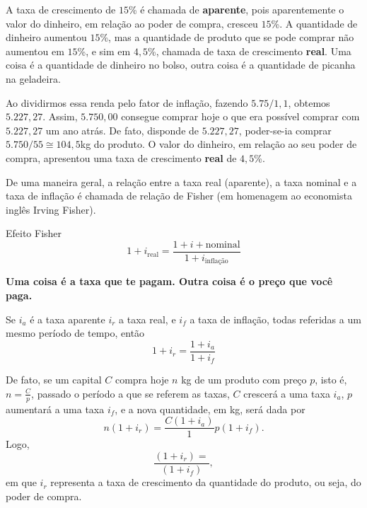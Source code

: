 A taxa de crescimento de $15$\% é chamada de \textbf{aparente}, pois aparentemente o valor do dinheiro, em relação ao poder de compra, cresceu $15$\%. A quantidade de dinheiro aumentou $15$\%, mas a quantidade de produto que se pode comprar não aumentou em $15$\%, e sim em $4{,}5$\%, chamada de taxa de crescimento \textbf{real}. Uma coisa é a quantidade de dinheiro no bolso, outra coisa é a quantidade de picanha na geladeira.

Ao dividirmos essa renda pelo fator de inflação, fazendo $5.75/1{,}1$, obtemos $5.227{,}27$. Assim, $5.750{,}00$ consegue comprar hoje o que era possível comprar com $5.227{,}27$ um ano atrás. De fato, disponde de $5.227{,}27$, poder-se-ia comprar $5.750/55\cong 104{,}5$kg do produto. O valor do dinheiro, em relação ao seu poder de compra, apresentou uma taxa de crescimento \textbf{real} de $4{,}5$\%.

De uma maneira geral, a relação entre a taxa real (aparente), a taxa nominal e a taxa de inflação é chamada de relação de Fisher (em homenagem ao economista inglês Irving Fisher).

\begin{center}
Efeito Fisher
\begin{equation*}
1+i_{\text{real}}=\frac{1+i+{\text{nominal}}}{1+i_{\text{inflação}}}
\end{equation*}
\end{center}

\textbf{Uma coisa é a taxa que te pagam. Outra coisa é o preço que você paga.}

\needspace{.15\textheight}
\begin{knowledge}
Se $i_a$ é a taxa aparente $i_r$ a taxa real, e $i_f$ a taxa de inflação, todas referidas a um mesmo período de tempo, então
\begin{equation*}
1+i_r=\frac{1+i_a}{1+i_f}
\end{equation*}

De fato, se um capital $C$ compra hoje $n$ kg de um produto com preço $p$, isto é, $\displaystyle n=\frac{C}{p}$, passado o período a que se referem as taxas, $C$ crescerá a uma taxa $i_a$, $p$ aumentará a uma taxa $i_f$, e a nova quantidade, em kg, será dada por
\begin{equation*}
n(1+i_r)=\frac{C(1+i_a)}1{p(1+i_f)}.
\end{equation*}
Logo,
\begin{equation*}
\frac{(1+i_r)=}{(1+i_f)},
\end{equation*}
em que $i_r$ representa a taxa de crescimento da quantidade do produto, ou seja, do poder de compra.
\end{knowledge}

